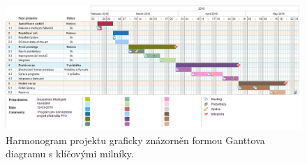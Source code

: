 \documentclass[12pt,a4paper]{article}
\begin{document}
\begin{landscape}
~\vfill
\begin{figure}[ht]
	\begin{center}
	\includegraphics[height = 0.6\textheight ]{PTO-Gantt.png}
	\caption{Harmonogram projektu graficky znázorněn formou Ganttova diagramu s klíčovými milníky.}
	\label{fig:diagram_gantt}
	\end{center}
\end{figure}
\vfill
\end{landscape}
\end{document}
